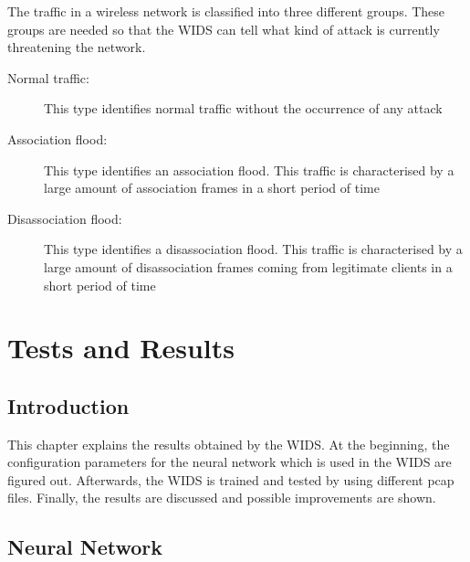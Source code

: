 The traffic in a wireless network is classified into three different groups. These groups are needed so that the WIDS can tell what kind of attack is currently threatening the network.

\begin{description}
    \item[Normal traffic:] This type identifies normal traffic without the occurrence of any attack
	\item[Association flood:] This type identifies an association flood. This traffic is characterised by a large amount of association frames in a short period of time
	\item[Disassociation flood:] This type identifies a disassociation flood. This traffic is characterised by a large amount of disassociation frames coming from legitimate clients in a short period of time
\end{description} 

\chapter{Tests and Results}

\section{Introduction}

This chapter explains the results obtained by the WIDS. At the beginning, the  configuration parameters for the neural network which is used in the WIDS are figured out. Afterwards, the WIDS is trained and tested by using different pcap files. Finally, the results are discussed and possible improvements are shown.

\section{Neural Network}
\label{sec:test_nn}

